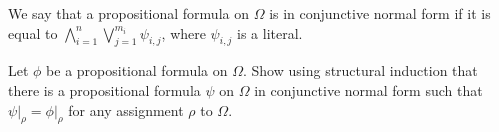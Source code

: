 \documentclass[addpoints]{exam}
\begin{document}
\begin{questions}
\begin{parts}
				We say that a propositional formula on $\Omega$ is in conjunctive normal form
				if it is equal to $\bigwedge_{i = 1}^n \bigvee_{j = 1}^{m_i} \psi_{i, j}$,
				where $\psi_{i, j}$ is a literal.
				
				Let $\phi$ be a propositional formula on $\Omega$. Show using structural induction
				that there is a propositional formula $\psi$ on $\Omega$ in conjunctive normal
				form such that $\psi\big\rvert_\rho = \phi\big\rvert_\rho$ for any
				assignment $\rho$ to $\Omega$.
            \begin{solution}[\stretch{1}]
              
            \end{solution}
      \end{parts}
      \newpage
  \end{questions}
\end{document}
